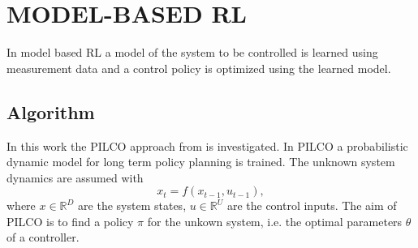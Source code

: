 \documentclass[letterpaper, 10 pt, conference]{ieeeconf}  %
\begin{document}
\section{MODEL-BASED RL}
In model based RL a model of the system to be controlled is learned using measurement data and a control policy is optimized using the learned model.


\subsection{Algorithm}
In this work the PILCO %
approach %
from \cite{PILCO_paper} is investigated. %
In PILCO a probabilistic dynamic model for long term policy planning is trained. The unknown system dynamics are assumed with 
\begin{equation}\label{PILCO_sysEq}
x_t = f\left(x_{t-1},u_{t-1}\right),
\end{equation}
where $x\in \mathbb{R}^D$ are the
system states, $u \in \mathbb{R}^U$ are the control inputs. The aim of PILCO is to find a policy $\pi$ for the unkown system, i.e. the optimal parameters $\theta$ of a controller.%
\end{document}
